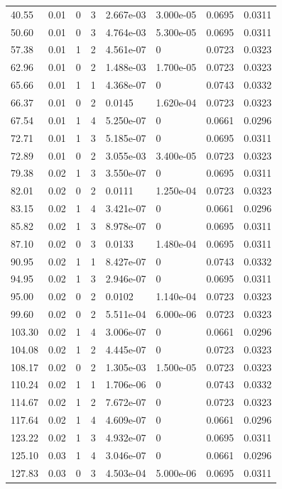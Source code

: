 \documentclass[preview]{standalone}
\begin{document}
{{\begin{tabular}{L{1.2cm}C{1.2cm} C{0.3cm}C{0.5cm} C{1.4cm}C{1.4cm} C{1.4cm}C{1.4cm}}
  40.55  &  0.01  & 0     &  3 &  2.667e-03  & 3.000e-05  & 0.0695 &  0.0311   \\ 
  50.60  &  0.01  & 0     &  3 &  4.764e-03  & 5.300e-05  & 0.0695 &  0.0311   \\ 
  57.38  &  0.01  & 1     &  2 &  4.561e-07  & 0  & 0.0723 &  0.0323   \\ 
  62.96  &  0.01  & 0     &  2 &  1.488e-03  & 1.700e-05  & 0.0723 &  0.0323   \\ 
  65.66  &  0.01  & 1     &  1 &  4.368e-07  & 0  & 0.0743 &  0.0332   \\ 
  66.37  &  0.01  & 0     &  2 &  0.0145  & 1.620e-04  & 0.0723 &  0.0323   \\ 
  67.54  &  0.01  & 1     &  4 &  5.250e-07  & 0  & 0.0661 &  0.0296   \\ 
  72.71  &  0.01  & 1     &  3 &  5.185e-07  & 0  & 0.0695 &  0.0311   \\ 
  72.89  &  0.01  & 0     &  2 &  3.055e-03  & 3.400e-05  & 0.0723 &  0.0323   \\ 
  79.38  &  0.02  & 1     &  3 &  3.550e-07  & 0  & 0.0695 &  0.0311   \\ 
  82.01  &  0.02  & 0     &  2 &  0.0111  & 1.250e-04  & 0.0723 &  0.0323   \\ 
  83.15  &  0.02  & 1     &  4 &  3.421e-07  & 0  & 0.0661 &  0.0296   \\ 
  85.82  &  0.02  & 1     &  3 &  8.978e-07  & 0  & 0.0695 &  0.0311   \\ 
  87.10  &  0.02  & 0     &  3 &  0.0133  & 1.480e-04  & 0.0695 &  0.0311   \\ 
  90.95  &  0.02  & 1     &  1 &  8.427e-07  & 0  & 0.0743 &  0.0332   \\ 
  94.95  &  0.02  & 1     &  3 &  2.946e-07  & 0  & 0.0695 &  0.0311   \\ 
  95.00  &  0.02  & 0     &  2 &  0.0102  & 1.140e-04  & 0.0723 &  0.0323   \\ 
  99.60  &  0.02  & 0     &  2 &  5.511e-04  & 6.000e-06  & 0.0723 &  0.0323   \\ 
  103.30  &  0.02  & 1     &  4 &  3.006e-07  & 0  & 0.0661 &  0.0296   \\ 
  104.08  &  0.02  & 1     &  2 &  4.445e-07  & 0  & 0.0723 &  0.0323   \\ 
  108.17  &  0.02  & 0     &  2 &  1.305e-03  & 1.500e-05  & 0.0723 &  0.0323   \\ 
  110.24  &  0.02  & 1     &  1 &  1.706e-06  & 0  & 0.0743 &  0.0332   \\ 
  114.67  &  0.02  & 1     &  2 &  7.672e-07  & 0  & 0.0723 &  0.0323   \\ 
  117.64  &  0.02  & 1     &  4 &  4.609e-07  & 0  & 0.0661 &  0.0296   \\ 
  123.22  &  0.02  & 1     &  3 &  4.932e-07  & 0  & 0.0695 &  0.0311   \\ 
  125.10  &  0.03  & 1     &  4 &  3.046e-07  & 0  & 0.0661 &  0.0296   \\ 
  127.83  &  0.03  & 0     &  3 &  4.503e-04  & 5.000e-06  & 0.0695 &  0.0311   \\ 
\hline 
\end{tabular} 

}}
\end{document}
